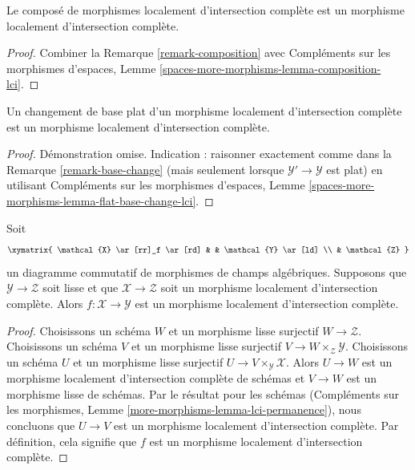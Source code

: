 \begin{lemma}
\label{lemma-composition-lci}
Le compos\'e de morphismes localement d'intersection compl\`ete est
un morphisme localement d'intersection compl\`ete.
\end{lemma}

\begin{proof}
Combiner
la Remarque \ref{remark-composition}
avec
Compl\'ements sur les morphismes d'espaces, Lemme
\ref{spaces-more-morphisms-lemma-composition-lci}.
\end{proof}

\begin{lemma}
\label{lemma-flat-base-change-lci}
Un changement de base plat d'un morphisme localement d'intersection compl\`ete est
un morphisme localement d'intersection compl\`ete.
\end{lemma}

\begin{proof}
D\'emonstration omise. Indication : raisonner exactement comme dans la Remarque \ref{remark-base-change}
(mais seulement lorsque $\mathcal{Y}' \to \mathcal{Y}$ est plat) en utilisant
Compl\'ements sur les morphismes d'espaces, Lemme
\ref{spaces-more-morphisms-lemma-flat-base-change-lci}.
\end{proof}

\begin{lemma}
\label{lemma-lci-permanence}
Soit
$$
\xymatrix{
\mathcal{X} \ar[rr]_f \ar[rd] & & \mathcal{Y} \ar[ld] \\
& \mathcal{Z}
}
$$
un diagramme commutatif de morphismes de champs alg\'ebriques.
Supposons que $\mathcal{Y} \to \mathcal{Z}$ soit lisse et que
$\mathcal{X} \to \mathcal{Z}$ soit un morphisme localement d'intersection compl\`ete.
Alors $f : \mathcal{X} \to \mathcal{Y}$ est un morphisme
localement d'intersection compl\`ete.
\end{lemma}

\begin{proof}
Choisissons un sch\'ema $W$ et un morphisme lisse surjectif $W \to \mathcal{Z}$.
Choisissons un sch\'ema $V$ et un morphisme lisse surjectif
$V \to W \times_\mathcal{Z} \mathcal{Y}$.
Choisissons un sch\'ema $U$ et un morphisme lisse surjectif
$U \to V \times_\mathcal{Y} \mathcal{X}$.
Alors $U \to W$ est un morphisme localement d'intersection compl\`ete de sch\'emas et
$V \to W$ est un morphisme lisse de sch\'emas. Par le r\'esultat pour les sch\'emas
(Compl\'ements sur les morphismes, Lemme \ref{more-morphisms-lemma-lci-permanence}),
nous concluons que $U \to V$ est un morphisme localement d'intersection compl\`ete.
Par d\'efinition, cela signifie que $f$ est un morphisme localement d'intersection compl\`ete.
\end{proof}





